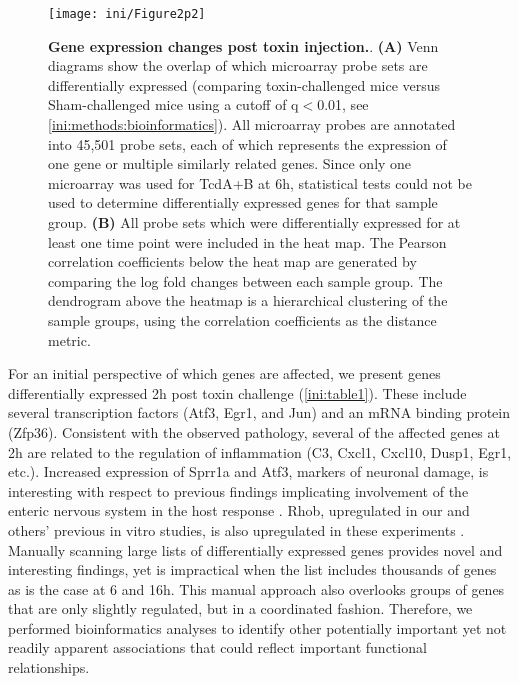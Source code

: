 \begin{figure}
  \centering
  \texttt{[image: ini/Figure2p2]}
  \caption[Gene expression changes post toxin injection]{
       \textbf{Gene expression changes post toxin injection.}.
       \textbf{(A)} Venn diagrams show the overlap of which microarray 
       probe sets are differentially expressed (comparing toxin-challenged 
       mice versus Sham-challenged mice using a cutoff of q$<$0.01, see 
       \ref{ini:methods:bioinformatics}). All microarray probes are 
       annotated into 45,501 probe sets, each of which represents 
       the expression of one gene or multiple similarly related 
       genes. Since only one microarray was used for TcdA+B at 6h, 
       statistical tests could not be used to determine differentially 
       expressed genes for that sample group. \textbf{(B)} All probe 
       sets which were differentially expressed for at least one 
       time point were included in the heat map. The Pearson correlation 
       coefficients below the heat map are generated by comparing the 
       log fold changes between each sample group. The dendrogram above 
       the heatmap is a hierarchical clustering of the sample groups, 
       using the correlation coefficients as the distance metric.    
  }
  \label{ini:fig2p2}
\end{figure}

For an initial perspective of which genes are affected, we present 
genes differentially expressed 2h post toxin challenge 
(\autoref{ini:table1}). These include several transcription factors 
(Atf3, Egr1, and Jun) and an mRNA binding protein (Zfp36). Consistent 
with the observed pathology, several of the affected genes at 2h are 
related to the regulation of inflammation (C3, Cxcl1, Cxcl10, Dusp1, 
Egr1, etc.). Increased expression of Sprr1a and Atf3, markers of 
neuronal damage, is interesting with respect to previous findings 
implicating involvement of the enteric nervous system in the host 
response \cite{Starkey:2009kn,Linhoff:2009dm}. Rhob, upregulated in 
our and others' previous in vitro studies, is also upregulated in 
these experiments \cite{DAuria:2012bd,Gerhard:2005dg}. Manually scanning 
large lists of differentially expressed genes provides novel and 
interesting findings, yet is impractical when the list includes 
thousands of genes as is the case at 6 and 16h. This manual approach 
also overlooks groups of genes that are only slightly regulated, 
but in a coordinated fashion. Therefore, we performed bioinformatics 
analyses to identify other potentially important yet not readily 
apparent associations that could reflect important functional relationships.

